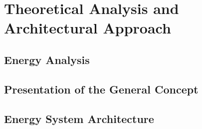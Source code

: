 \chapter{Theoretical Analysis and Architectural Approach}
\label{chap:analysis-and-arch}
%
\section{Energy Analysis}
\section{Presentation of the General Concept}
\section{Energy System Architecture}
